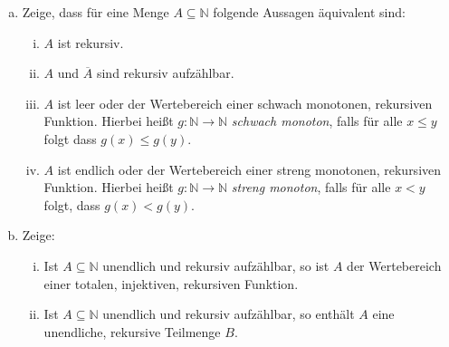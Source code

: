 \documentclass[german,headsepline]{scrartcl}
\begin{document}
	\begin{question}[subtitle={Blatt 13, 2015}]
		\begin{enumerate}[(a)]
			\item Zeige, dass für eine Menge $A\subseteq\mathbb{N}$ folgende Aussagen äquivalent sind:
				\begin{enumerate}[(i)]
					\item $A$ ist rekursiv.
					\item $A$ und $\overline{A}$ sind rekursiv aufzählbar.
					\item $A$ ist leer oder der Wertebereich einer schwach monotonen, rekursiven Funktion.
						Hierbei heißt $g:\mathbb{N}\to\mathbb{N}$ \emph{schwach monoton},
						falls für alle $x\leq y$ folgt dass $g(x)\leq g(y)$.
					\item $A$ ist endlich oder der Wertebereich einer streng monotonen, rekursiven Funktion.
						Hierbei heißt $g:\mathbb{N}\to\mathbb{N}$ \emph{streng monoton}, falls für alle $x<y$ folgt, dass $g(x)<g(y)$.
				\end{enumerate}
			\item Zeige:
				\begin{enumerate}[(i)]
					\item Ist $A\subseteq\mathbb{N}$ unendlich und rekursiv aufzählbar,
						so ist $A$ der Wertebereich einer totalen, injektiven, rekursiven Funktion.
					\item Ist $A\subseteq\mathbb{N}$ unendlich und rekursiv aufzählbar,
						so enthält $A$ eine unendliche, rekursive Teilmenge $B$.
				\end{enumerate}
		\end{enumerate}
	\end{question}
\end{document}
